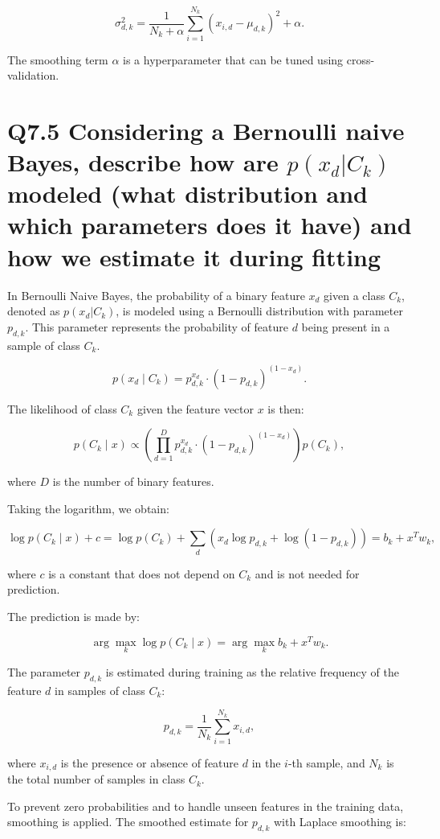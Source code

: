 \documentclass[11pt]{article}
\begin{document}
\[
\sigma_{d,k}^2 = \frac{1}{N_k + \alpha} \sum_{i=1}^{N_k} (x_{i,d} - \mu_{d,k})^2 + \alpha.
\]

The smoothing term \( \alpha \) is a hyperparameter that can be tuned using cross-validation.

\section{Q7.5 Considering a Bernoulli naive Bayes, describe how are $p(x_d | C_k)$ modeled (what distribution and which parameters does it have) and how we estimate it during fitting}

In Bernoulli Naive Bayes, the probability of a binary feature \( x_d \) given a class \( C_k \), denoted as \( p(x_d | C_k) \), is modeled using a Bernoulli distribution with parameter \( p_{d,k} \). This parameter represents the probability of feature \( d \) being present in a sample of class \( C_k \).

\[
p(x_d \mid C_k) = p_{d,k}^{x_d} \cdot (1 - p_{d,k})^{(1-x_d)}.
\]

The likelihood of class \( C_k \) given the feature vector \( x \) is then:

\[
p(C_k \mid x) \propto \left( \prod_{d=1}^{D} p_{d,k}^{x_d} \cdot (1 - p_{d,k})^{(1-x_d)} \right) p(C_k),
\]

where \( D \) is the number of binary features.

Taking the logarithm, we obtain:

\[
\log p(C_k \mid x) + c = \log p(C_k) + \sum_{d} \left( x_d \log p_{d,k} + \log(1 - p_{d,k}) \right) = b_k + x^T w_k,
\]

where \( c \) is a constant that does not depend on \( C_k \) and is not needed for prediction.

The prediction is made by:

\[
\arg \max_k \log p(C_k \mid x) = \arg \max_k b_k + x^T w_k.
\]

The parameter \( p_{d,k} \) is estimated during training as the relative frequency of the feature \( d \) in samples of class \( C_k \):

\[
p_{d,k} = \frac{1}{N_k} \sum_{i=1}^{N_k} x_{i,d},
\]

where \( x_{i,d} \) is the presence or absence of feature \( d \) in the \( i \)-th sample, and \( N_k \) is the total number of samples in class \( C_k \).

To prevent zero probabilities and to handle unseen features in the training data, smoothing is applied. The smoothed estimate for \( p_{d,k} \) with Laplace smoothing is:
\end{document}
